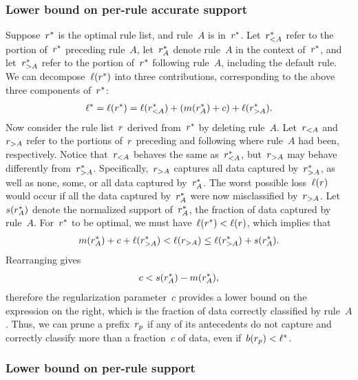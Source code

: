 \subsubsection{Lower bound on per-rule accurate support}

Suppose~${r}^*$ is the optimal rule list, and rule~$A$ is in~${r}^*$.
%
Let~${r}_{<A}^*$ refer to the portion of~${r}^*$ preceding rule~$A$,
let~${r}_A^*$ denote rule~$A$ in the context of~${r}^*$, and let~${r}_{>A}^*$
refer to the portion of~${r}^*$ following rule~$A$, including the default rule.
%
We can decompose~$\ell({r}^*)$ into three contributions,
corresponding to the above three components of~${r}^*$:
\begin{align}
\ell^* = \ell(\RL^*) = \ell(\RL_{<A}^*) + (m(\RL_A^*) + c) + \ell(\RL_{>A}^*).
\end{align}
Now consider the rule list~${r}$ derived from~${r}^*$ by deleting rule~$A$.
%
Let~${r}_{<A}$ and~${r}_{>A}$ refer to the portions of~${r}$
preceding and following where rule~$A$ had been, respectively.
%
Notice that~${r}_{<A}$ behaves the same as~${r}_{<A}^*$,
but~${r}_{>A}$ may behave differently from~${r}_{>A}^*$.
%
Specifically,~${r}_{>A}$ captures all data captured by~${r}_{>A}^*$, as well as
none, some, or all data captured by~${r}_A^*$.
%
The worst possible loss~$\ell({r})$ would occur if all the data
captured by~${r}_A^*$ were now misclassified by~${r}_{>A}$.
%
Let~$s({r}_A^*)$ denote the normalized support of~${r}_A^*$,
\ie the fraction of data captured by rule~$A$.
%
For~${r}^*$ to be optimal, we must have~${\ell({r}^*) < \ell({r})}$, which implies that
\begin{align}
m(\RL_A^*) + c + \ell(\RL_{>A}^*) < \ell(\RL_{>A}) \le \ell(\RL_{>A}^*) + s(\RL_A^*).
\end{align}
Rearranging gives
\begin{align}
c < s(\RL_A^*) - m(\RL_A^*),
\label{eq:min-capture-correct}
\end{align}
therefore the regularization parameter~$c$ provides a lower bound on the expression
on the right, which is the fraction of data correctly classified by rule~$A$.
%
Thus, we can prune a prefix~${r_p}$ if any of its antecedents do not capture and
correctly classify more than a fraction~$c$ of data, even if~${b({r_p}) < \ell^*}$.

\subsubsection{Lower bound on per-rule support}

